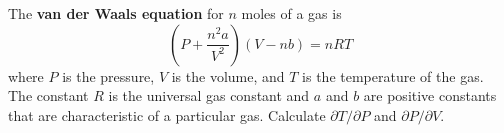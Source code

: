 \begin{exercise}
	The \textbf{van der Waals equation} for $n$ moles of a gas is
	\begin{equation}
	\label{equation-van-der-waals}
	\left( P + \frac{n^2a}{V^2} \right) \left( V - nb \right) = nRT
	\end{equation}
	where $P$ is the pressure, $V$ is the volume, and $T$ is the temperature of the gas. The constant $R$ is the universal gas constant and $a$ and $b$ are positive constants that are characteristic of a particular gas. Calculate $\partial T / \partial P$ and $\partial P / \partial V$.
\end{exercise}
